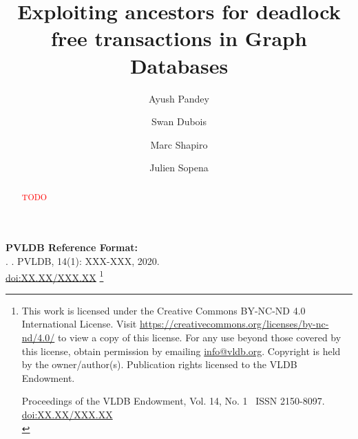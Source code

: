 \documentclass[sigconf, nonacm]{acmart}
\newcommand\vldbdoi{XX.XX/XXX.XX}
\newcommand\vldbpages{XXX-XXX}
\newcommand\vldbvolume{14}
\newcommand\vldbissue{1}
\newcommand\vldbyear{2020}
\newcommand\vldbauthors{\authors}
\newcommand\vldbtitle{\shorttitle}
\newcommand\vldbpagestyle{plain}
\begin{document}
\title{Exploiting ancestors for deadlock free transactions in Graph Databases}

\author{Ayush Pandey}

\author{Swan Dubois}

\author{Marc Shapiro}

\author{Julien Sopena}


\begin{abstract}
\textcolor{red}{TODO}
\end{abstract}

\maketitle

\pagestyle{\vldbpagestyle}
\begingroup\small\noindent\raggedright\textbf{PVLDB Reference Format:}\\
\vldbauthors. \vldbtitle. PVLDB, \vldbvolume(\vldbissue): \vldbpages, \vldbyear.\\
\href{https://doi.org/\vldbdoi}{doi:\vldbdoi}
\endgroup
\begingroup
\renewcommand\thefootnote{}\footnote{\noindent
This work is licensed under the Creative Commons BY-NC-ND 4.0 International License. Visit \url{https://creativecommons.org/licenses/by-nc-nd/4.0/} to view a copy of this license. For any use beyond those covered by this license, obtain permission by emailing \href{mailto:info@vldb.org}{info@vldb.org}. Copyright is held by the owner/author(s). Publication rights licensed to the VLDB Endowment. \\
\raggedright Proceedings of the VLDB Endowment, Vol. \vldbvolume, No. \vldbissue\ %
ISSN 2150-8097. \\
\href{https://doi.org/\vldbdoi}{doi:\vldbdoi} \\
}\addtocounter{footnote}{-1}\endgroup
\end{document}

